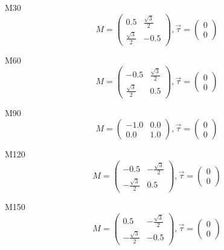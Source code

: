 \documentclass[12pt, fleqn]{article}
\begin{document}
M30
\begin{equation}
    M=
    \begin{pmatrix}
        0.5&\frac{\sqrt{3}}{2}\\
        \frac{\sqrt{3}}{2}&-0.5
    \end{pmatrix}
    ,\vec{\tau}=
    \begin{pmatrix}
        0\\
        0
    \end{pmatrix}
    \label{M30}
\end{equation}

M60
\begin{equation}
    M=
    \begin{pmatrix}
        -0.5&\frac{\sqrt{3}}{2}\\
        \frac{\sqrt{3}}{2}&0.5
    \end{pmatrix}
    ,\vec{\tau}=
    \begin{pmatrix}
        0\\
        0
    \end{pmatrix}
    \label{M60}
\end{equation}

M90
\begin{equation}
    M=
    \begin{pmatrix}
        -1.0&0.0\\
        0.0&1.0
    \end{pmatrix}
    ,\vec{\tau}=
    \begin{pmatrix}
        0\\
        0
    \end{pmatrix}
    \label{M90}
\end{equation}

M120
\begin{equation}
    M=
    \begin{pmatrix}
        -0.5&-\frac{\sqrt{3}}{2}\\
        -\frac{\sqrt{3}}{2}&0.5
    \end{pmatrix}
    ,\vec{\tau}=
    \begin{pmatrix}
        0\\
        0
    \end{pmatrix}
    \label{M120}
\end{equation}

M150
\begin{equation}
    M=
    \begin{pmatrix}
        0.5&-\frac{\sqrt{3}}{2}\\
        -\frac{\sqrt{3}}{2}&-0.5
    \end{pmatrix}
    ,\vec{\tau}=
    \begin{pmatrix}
        0\\
        0
    \end{pmatrix}
    \label{M150}
\end{equation}
\end{document}
